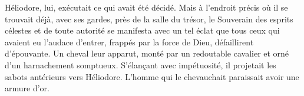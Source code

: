 Héliodore, lui, exécutait ce qui avait été décidé.
Mais à l’endroit précis où il se trouvait déjà, avec ses gardes,
	près de la salle du trésor,
	le Souverain des esprits célestes et de toute autorité se manifesta
	avec un tel éclat que tous ceux qui avaient eu l’audace d’entrer,
	frappés par la force de Dieu, défaillirent d’épouvante.
Un cheval leur apparut,
	monté par un redoutable cavalier et orné d’un harnachement somptueux.
S’élançant avec impétuosité, il projetait les sabots antérieurs vers Héliodore.
L’homme qui le chevauchait paraissait avoir une armure d’or.
